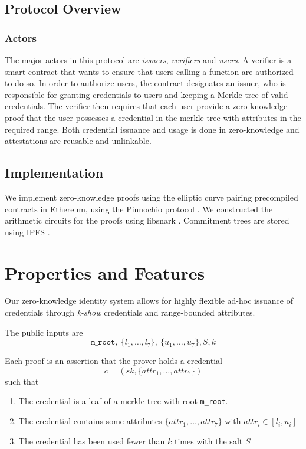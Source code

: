 \documentclass[11 pt]{extarticle}
\theoremstyle{remark}
\begin{document}
\subsection{Protocol Overview}
\subsubsection{Actors}
The major actors in this protocol are \textit{issuers}, \textit{verifiers} and
\textit{users}. A verifier is a  smart-contract that wants to ensure that
users calling a function are authorized to do so. In order to authorize users,
the contract designates an issuer, who is responsible for granting credentials
to users and keeping a Merkle tree of valid credentials. The verifier then
requires that each user provide a zero-knowledge proof that the user possesses a
credential in the merkle tree with attributes in the required range. Both
credential issuance and usage is done in zero-knowledge and attestations are
reusable and unlinkable.

\subsection{Implementation}
We implement zero-knowledge proofs using the elliptic curve pairing precompiled
contracts in Ethereum, using the Pinnochio protocol
\cite{parnoPinocchioNearlyPractical2013}. We constructed the arithmetic circuits
for the proofs using libsnark \cite{ben-sassonSNARKsVerifyingProgram2013}.
Commitment trees are stored using IPFS \cite{benetIPFSContentAddressed2014}.


\section{Properties and Features}
Our zero-knowledge identity system allows for highly flexible ad-hoc issuance of
credentials through \textit{k-show} credentials and range-bounded attributes.


The public inputs are
\begin{equation*}
  \texttt{m\_root},\ \{l_1, \dots, l_7\},\ \{u_1, \dots, u_7\}, S, k
\end{equation*}

Each proof is an assertion that the prover holds a credential
\begin{equation*}
c = (sk, \{attr_1, \dots, attr_7\})  
\end{equation*}
 such that 

\begin{enumerate}[1.]
\item The credential is a leaf of a merkle tree with root \texttt{m\_root}.
\item The credential contains some attributes $\{attr_1, \dots, attr_7\}$ with
  $attr_i \in [l_i,u_i]$
\item The credential has been used fewer than $k$ times with the salt $S$
\end{enumerate}
\end{document}
